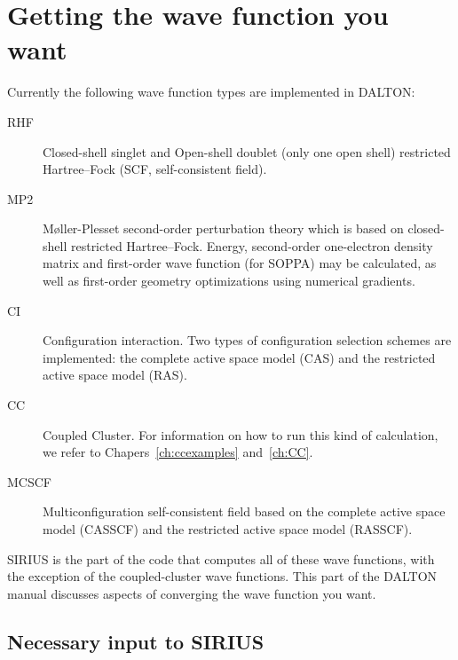 \chapter{\label{ch:wf-guide}Getting the wave function you want}

Currently the following wave function types are implemented in DALTON:

\begin{description}

\item[RHF] Closed-shell singlet and Open-shell doublet (only one open shell)
restricted Hartree--Fock (SCF, self-consistent
field).

\item[MP2]
M{\o}ller-Plesset second-order perturbation theory which is based on
closed-shell restricted Hartree--Fock.  Energy, second-order one-electron
density matrix and first-order wave function (for SOPPA) may be
calculated, as well as first-order geometry optimizations using
numerical gradients. 

\item[CI] Configuration
interaction. Two types of
configuration selection schemes are implemented: the complete active
space model (CAS) and the restricted active space model (RAS).

\item[CC] Coupled Cluster.
For information on how to run this kind of calculation, we refer to 
Chapers~\ref{ch:ccexamples} and~\ref{ch:CC}.

\item[MCSCF] Multiconfiguration self-consistent field based on
the complete active space model (CASSCF) and
the restricted active space model
(RASSCF).

\end{description}

SIRIUS is the part of the code that computes all of these
wave functions, with the exception of the coupled-cluster wave functions.
This part of the DALTON manual discusses aspects of converging the
wave function you want.

\section{\label{sec:ig_necinp} Necessary input to SIRIUS}

